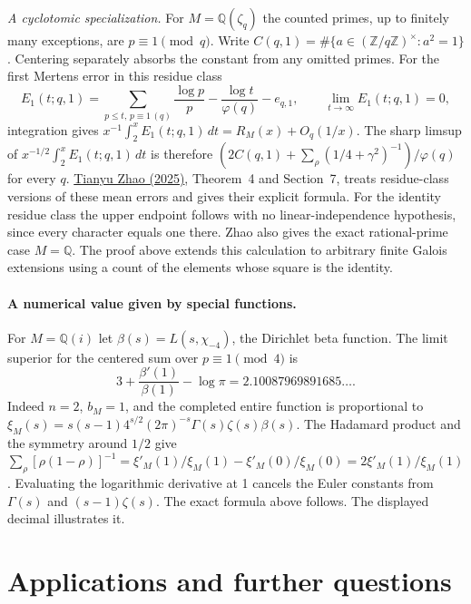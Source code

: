 \documentclass[11pt]{article}
\newcommand{\Q}{\mathbb Q}\newcommand{\R}{\mathbb R}
\begin{document}
\smallskip\noindent\emph{A cyclotomic specialization.}
For $M=\mathbb Q(\zeta_q)$ the counted primes, up to finitely many
exceptions, are $p\equiv1\pmod q$. Write
$C(q,1)=\#\{a\in(\mathbb Z/q\mathbb Z)^\times:a^2=1\}$.
Centering separately absorbs the constant from any omitted primes.
For the first Mertens error in this residue class
\[
 E_1(t;q,1)=\sum_{p\le t,\,p\equiv1\,(q)}\frac{\log p}{p}
           -\frac{\log t}{\varphi(q)}-e_{q,1},
 \qquad \lim_{t\to\infty}E_1(t;q,1)=0,
\]
integration gives $x^{-1}\int_2^x E_1(t;q,1)\,dt=R_M(x)+O_q(1/x)$.
The sharp limsup of $x^{-1/2}\int_2^x E_1(t;q,1)\,dt$ is therefore
$(2C(q,1)+\sum_\rho(1/4+\gamma^2)^{-1})/\varphi(q)$ for every $q$.
\href{https://doi.org/10.1007/s40993-025-00640-y}{Tianyu Zhao (2025)},
Theorem~4 and Section~7, treats residue-class versions of these mean errors
and gives their explicit formula. For the identity residue class the
upper endpoint follows with no linear-independence hypothesis, since every
character equals one there. Zhao also gives the exact rational-prime case
$M=\mathbb Q$. The proof above extends this calculation to arbitrary finite
Galois extensions using a count of the elements whose square is the identity.

\paragraph{A numerical value given by special functions.}
For $M=\Q(i)$ let $\beta(s)=L(s,\chi_{-4})$, the Dirichlet beta function. The limit superior for the centered sum over $p\equiv1\pmod4$ is
\[
       3+\frac{\beta'(1)}{\beta(1)}-\log\pi
        =2.10087969891685\ldots .
\]
Indeed $n=2$, $b_M=1$, and the completed entire function is proportional to
$\xi_M(s)=s(s-1)4^{s/2}(2\pi)^{-s}\Gamma(s)\zeta(s)\beta(s)$.
The Hadamard product and the symmetry around $1/2$ give
$\sum_\rho[\rho(1-\rho)]^{-1}=\xi'_M(1)/\xi_M(1)-\xi'_M(0)/\xi_M(0)=2\xi'_M(1)/\xi_M(1)$.
Evaluating the logarithmic derivative at 1 cancels the Euler constants from $\Gamma(s)$ and $(s-1)\zeta(s)$. The exact formula above follows. The displayed decimal illustrates it.


\section{Applications and further questions}

\end{document}
